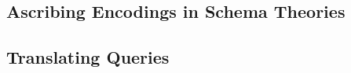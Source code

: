  \subsection{Ascribing Encodings in Schema Theories}\label{sec:vt:codec}
  
 \subsection{Translating Queries}\label{sec:qmt}
  



